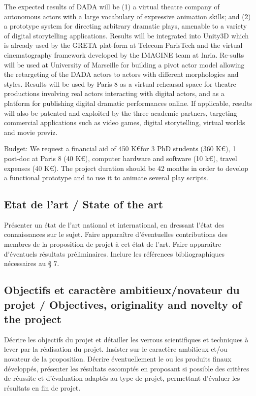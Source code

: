 The expected results of DADA will be (1) a virtual theatre company of autonomous actors with a large vocabulary of expressive animation skills; and (2) a prototype system for directing arbitrary dramatic plays, amenable to a variety of digital storytelling applications. Results will be integrated into Unity3D which is already used by the GRETA plat-form at Telecom ParisTech and the virtual cinematography framework developed by the IMAGINE team at Inria. Re-sults will be used at University of Marseille for building a pivot actor model allowing the retargeting of the DADA actors to actors with different morphologies and styles. Results will be used by Paris 8 as a virtual rehearsal space for theatre productions involving real actors interacting with digital actors, and as a platform for publishing digital dramatic performances online. If applicable, results will also be patented and exploited by the three academic partners, targeting commercial applications such as video games, digital storytelling, virtual 
worlds and movie previz.

Budget: We request a financial aid of 450 K\euro for 3 PhD students (360 K\euro), 1 post-doc at Paris 8 (40 K\euro), computer hardware and software (10 k\euro), travel expenses (40 K\euro). The project duration should be 42 months in order to develop a functional prototype and to use it to animate several play scripts.



\subsection{Etat de l'art / State of the art}
\begin{xcomment}  
Pr\'esenter un \'etat de l'art national et international, en dressant l'\'etat des connaissances sur le sujet. 
Faire apparaître d'\'eventuelles contributions des membres de la proposition de projet à cet \'etat de l'art.
Faire apparaître d'\'eventuels r\'esultats pr\'eliminaires. 
Inclure les r\'ef\'erences bibliographiques n\'ecessaires au § 7.
\end{xcomment}

\nocite{*}

\subsection{Objectifs et caract\`ere ambitieux/novateur du projet / Objectives, originality and novelty of the project}
\begin{xcomment}  
D\'ecrire les objectifs du projet et d\'etailler les verrous scientifiques et techniques à lever par la r\'ealisation du projet. Insister sur le caract\`ere ambitieux et/ou novateur de la proposition.
D\'ecrire \'eventuellement le ou les produits finaux d\'evelopp\'es, pr\'esenter les r\'esultats escompt\'es en proposant si possible des crit\`eres de r\'eussite et d'\'evaluation adapt\'es au type de projet, permettant d'\'evaluer les r\'esultats en fin de projet.
\end{xcomment}  


\endinput
